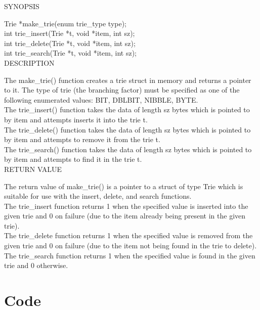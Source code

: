 \documentclass{llncs}
\begin{document}
\noindent SYNOPSIS

Trie *make\_trie(enum trie\_type type);\\
int trie\_insert(Trie *t, void *item, int sz);\\
int trie\_delete(Trie *t, void *item, int sz);\\
int trie\_search(Trie *t, void *item, int sz);\\

\noindent DESCRIPTION

The make\_trie() function creates a trie struct in memory and returns a pointer to it. The type of trie (the branching factor) must be specified as one of the following enumerated values: BIT, DBLBIT, NIBBLE, BYTE.\\
The trie\_insert() function takes the data of length sz bytes which is pointed to by item and attempts inserts it into the trie t.\\
The trie\_delete() function takes the data of length sz bytes which is pointed to by item and attempts to remove it from the trie t.\\
The trie\_search() function takes the data of length sz bytes which is pointed to by item and attempts to find it in the trie t.\\

\noindent RETURN VALUE

\noindent The return value of make\_trie() is a pointer to a struct of type Trie which is suitable for use with the insert, delete, and search functions.\\
The trie\_insert function returns 1 when the specified value is inserted into the given trie and 0 on failure (due to the item already being present in the given trie).\\
The trie\_delete function returns 1 when the specified value is removed from the given trie and 0 on failure (due to the item not being found in the trie to delete).\\
The trie\_search function returns 1 when the specified value is found in the given trie and 0 otherwise.\\

\newpage
\section{Code}

\newpage

\end{document}
